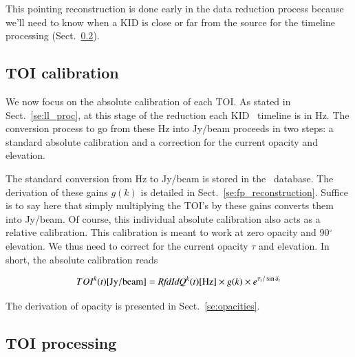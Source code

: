 This pointing reconstruction is done early in the data reduction process because
we'll need to know when a KID is close or far from the source for the timeline
processing (Sect.~\ref{se:toi_proc}).

\subsection{TOI calibration}
\label{se:flux_calib}

We now focus on the absolute calibration of each TOI. As stated in
Sect.~\ref{se:ll_proc}, at this stage of the reduction each KID \rf~timeline is
in Hz. The conversion process to go from these Hz into Jy/beam proceeds in two
steps: a standard absolute calibration and a correction for the current opacity
and elevation.

The standard conversion from Hz to Jy/beam is stored in the
\kidpar\ database. The derivation of these gains $g(k)$ is detailed in
Sect.~\ref{se:fp_reconstruction}. Suffice is to say here that simply multiplying
the TOI's by these gains converts them into Jy/beam. Of course, this individual
absolute calibration also acts as a relative calibration. This calibration is
meant to work at zero opacity and 90$^\circ$ elevation. We thus need to correct
for the current opacity $\tau$ and elevation. In short, the absolute calibration reads

\begin{equation}
TOI^k(t) [{\rm Jy/beam}] = \emph{RfdIdQ}^k(t)[{\rm Hz}] \times g(k) \times e^{\tau_t/\sin\delta_t}
\end{equation}

The derivation of opacity is presented in Sect.~\ref{se:opacities}.

\subsection{TOI processing}
\label{se:toi_proc}


